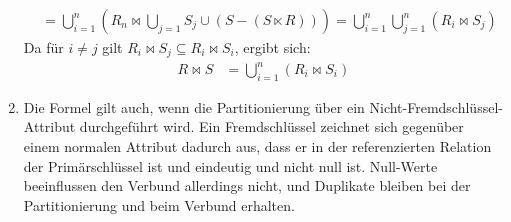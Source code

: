 \documentclass[11pt,a4paper]{scrartcl}
\begin{document}
\begin{enumerate}
\begin{align*}
    &= \bigcup_{i=1}^n \left(R_n \bowtie \bigcup_{j=1} S_j \cup \left(S -
        \left(S \ltimes R\right)\right)\right) = \bigcup_{i=1}^n\bigcup_{j=1}^n
    \left(R_i \bowtie S_j\right)
  \end{align*}
  Da für $i \ne j$ gilt $R_i \bowtie S_j \subseteq R_i \bowtie S_i$, ergibt
  sich:
  \begin{align*}
    R \bowtie S &= \bigcup_{i=1}^n \left(R_i \bowtie S_i\right)
  \end{align*}
\item Die Formel gilt auch, wenn die Partitionierung über ein
  Nicht-Fremdschlüssel-Attribut durchgeführt wird.  Ein Fremdschlüssel zeichnet
  sich gegenüber einem normalen Attribut dadurch aus, dass er in der
  referenzierten Relation der Primärschlüssel ist und eindeutig und nicht null
  ist.  Null-Werte beeinflussen den Verbund allerdings nicht, und Duplikate
  bleiben bei der Partitionierung und beim Verbund erhalten.
\end{enumerate}
\end{document}
